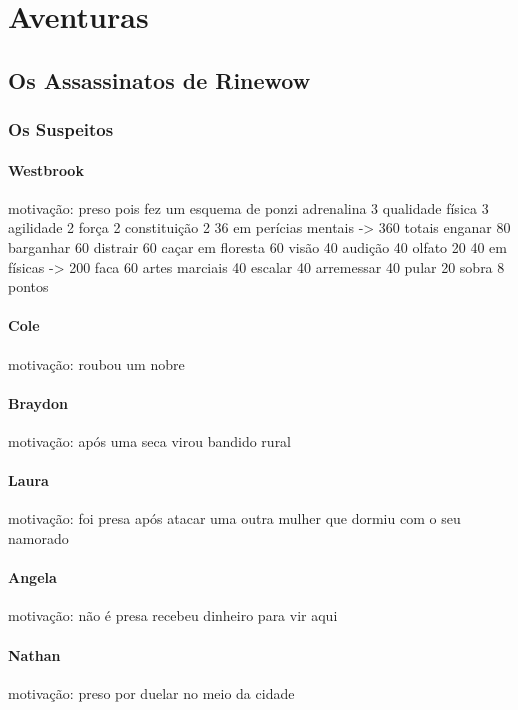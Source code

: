 \part{Aventuras}
\chapter{Os Assassinatos de Rinewow}
% 
\section{Os Suspeitos}
\subsection{Westbrook}
motivação: preso pois fez um esquema de ponzi
adrenalina 3 qualidade física 3 agilidade 2  força 2 constituição 2 
36 em perícias mentais -> 360 totais
  enganar 80
  barganhar 60
  distrair 60
  caçar em floresta 60
  visão 40
  audição 40
  olfato 20
40 em físicas -> 200 
  faca 60
  artes marciais 40
  escalar 40
  arremessar 40
  pular 20
sobra 8 pontos
\subsection{Cole}
motivação: roubou um nobre
\subsection{Braydon}
motivação: após uma seca virou bandido rural 
\subsection{Laura}
motivação: foi presa após atacar uma outra mulher que dormiu com o seu namorado
\subsection{Angela}
motivação: não é presa recebeu dinheiro para vir aqui
\subsection{Nathan}
motivação: preso por duelar no meio da cidade
